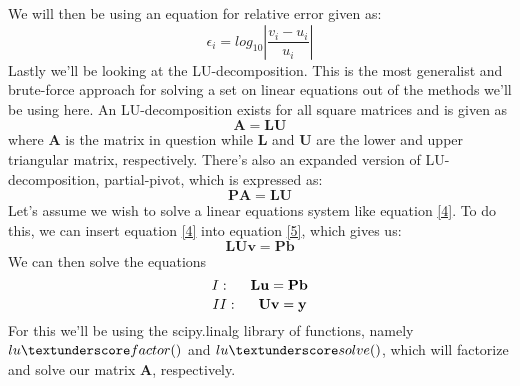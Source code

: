 \documentclass{article}
\begin{document}
We will then be using an equation for relative error given as:
\begin{equation} \label{6}
    \epsilon_{i} = log_{10} |\frac{v_i-u_i}{u_i}|
\end{equation}
Lastly we'll be looking at the LU-decomposition. This is the most generalist and brute-force approach for solving a set on linear equations out of the methods we'll be using here. An LU-decomposition exists for all square matrices and is given as
\begin{equation}
\mathbf{A}=\mathbf{L}\mathbf{U}
\end{equation}
where $\mathbf{A}$ is the matrix in question while $\mathbf{L}$ and $\mathbf{U}$ are the lower and upper triangular matrix, respectively. There's also an expanded version of LU-decomposition, partial-pivot, which is expressed as:
\begin{equation} \label{5}
\mathbf{P}\mathbf{A}=\mathbf{L}\mathbf{U}
\end{equation}
Let's assume we wish to solve a linear equations system like equation \ref{4}. To do this, we can insert
equation \ref{4} into equation \ref{5}, which gives us:
\begin{equation*}
\mathbf{L}\mathbf{U}\mathbf{v}=\mathbf{P}\mathbf{b}
\end{equation*}
We can then solve the equations
\begin{equation*}
I: \hspace{0.5cm}\mathbf{L}\mathbf{u}=\mathbf{P}\mathbf{b}
\end{equation*}
\begin{equation*}
II: \hspace{0.5cm}\mathbf{U}\mathbf{v}=\mathbf{y}
\end{equation*}
For this we'll be using the scipy.linalg library of functions, namely $lu\textunderscore factor()$ and $lu\textunderscore solve()$, which will factorize and solve our matrix $\mathbf{A}$, respectively.
\end{document}

